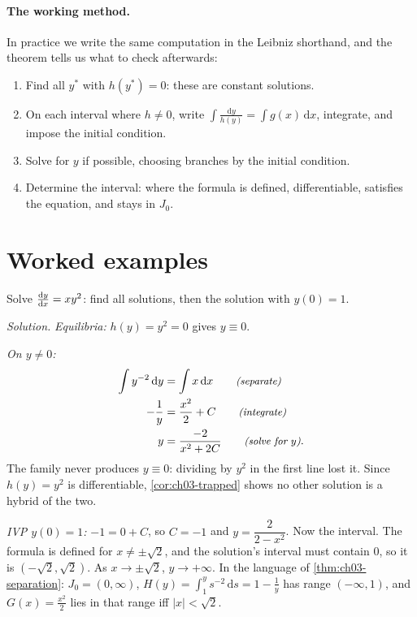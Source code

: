 \paragraph{The working method.} In practice we write the same computation in
the Leibniz shorthand, and the theorem tells us what to check afterwards:
\begin{enumerate}[label=(\arabic*)]
  \item Find all $y^*$ with $h(y^*) = 0$: these are constant solutions.
  \item On each interval where $h\neq0$, write
        $\displaystyle\int\frac{\mathrm{d}y}{h(y)} = \int g(x)\,\mathrm{d}x$,
        integrate, and impose the initial condition.
  \item Solve for $y$ if possible, choosing branches by the initial condition.
  \item Determine the interval: where the formula is defined, differentiable,
        satisfies the equation, and stays in $J_0$.
\end{enumerate}

\section{Worked examples}\label{sec:ch03-examples}

\begin{example}\label{ex:ch03-xy2}
Solve $\frac{\mathrm{d}y}{\mathrm{d}x} = xy^2$: find all solutions, then the solution with
$y(0) = 1$.

\emph{Solution.} \emph{Equilibria:} $h(y) = y^2 = 0$ gives $y\equiv 0$.

\emph{On $y\neq 0$:}
\begin{align*}
  \int y^{-2}\,\mathrm{d}y &= \int x\,\mathrm{d}x \qquad\text{\small\itshape(separate)}\\
  -\frac1y &= \frac{x^2}{2} + C \qquad\text{\small\itshape(integrate)}\\
  y &= \frac{-2}{x^2 + 2C} \qquad\text{\small\itshape(solve for $y$)}.
\end{align*}
The family never produces $y\equiv0$: dividing by $y^2$ in the first line
lost it. Since $h(y) = y^2$ is differentiable, \cref{cor:ch03-trapped} shows
no other solution is a hybrid of the two.

\emph{IVP $y(0)=1$:} $-1 = 0 + C$, so $C = -1$ and $y = \dfrac{2}{2 - x^2}$. Now
the interval. The formula is defined for $x\neq\pm\sqrt2$, and the solution's
interval must contain $0$, so it is $(-\sqrt2,\sqrt2)$. As
$x\to\pm\sqrt2$, $y\to+\infty$. In the language of
\cref{thm:ch03-separation}: $J_0 = (0,\infty)$,
$H(y) = \int_1^y s^{-2}\,\mathrm{d}s = 1 - \frac1y$ has range $(-\infty, 1)$, and
$G(x) = \frac{x^2}{2}$ lies in that range iff $|x|<\sqrt2$.
\end{example}


